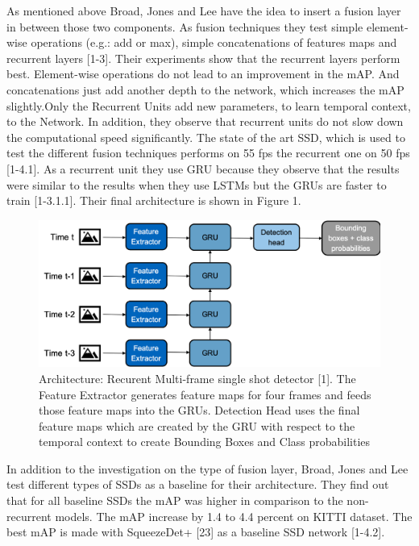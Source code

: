 \documentclass[conference]{IEEEtran}
\begin{document}
As mentioned above Broad, Jones and Lee have the idea to insert a fusion layer in between those two components. As fusion techniques they test simple element-wise operations (e.g.: add or max), simple concatenations of features maps and recurrent layers [1-3]. Their experiments show that the recurrent layers perform best. Element-wise operations do not lead to an improvement in the mAP. And concatenations just add another depth to the network, which increases the mAP slightly.Only the Recurrent Units add new parameters, to learn temporal context, to the Network. In addition, they observe that recurrent units do not slow down the computational speed significantly. The state of the art SSD, which is used to test the different fusion techniques performs on 55 fps the recurrent one on 50 fps [1-4.1]. As a recurrent unit they use GRU because they observe that the results were similar to the results when they use LSTMs but the GRUs are faster to train [1-3.1.1]. Their final architecture is shown in Figure 1.  \newline

\begin{figure} [h]
\includegraphics[width=\columnwidth]{RMFSSD}
\caption{Architecture: Recurent Multi-frame single shot detector [1]. The Feature Extractor generates feature maps for four frames and feeds those feature maps into the GRUs. Detection Head uses the final feature maps which are created by the GRU with respect to the temporal context to create Bounding Boxes and Class probabilities}
\end{figure}

In addition to the investigation on the type of fusion layer, Broad, Jones and Lee test different types of SSDs as a baseline for their architecture. They find out that for all baseline SSDs the mAP was higher in comparison to the non-recurrent models. The mAP increase by 1.4 to 4.4 percent on KITTI dataset.  The best mAP is made with SqueezeDet+ [23] as a baseline SSD network [1-4.2].  \newline
\end{document}
